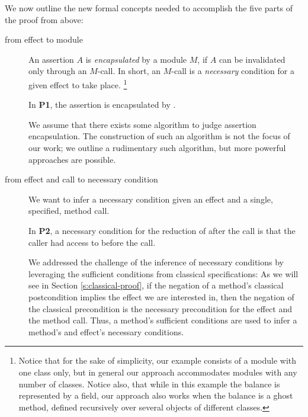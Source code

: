 We  now outline  the new formal concepts needed to accomplish the five parts of the proof from above:

\begin{description}
  \item[from effect to module]  An assertion $A$  is
\emph{encapsulated} by a module $M$, if  $A$ can be invalidated only through
    an $M$-\internalC call. 
  In short, an $M$-\internalC call is a \emph{necessary} condition for
a given effect to take place.
\footnote{Notice that for the sake of simplicity, our example consists of a module with one class only, but 
    in general our approach accommodates modules with any number of classes.
     Notice also, that while in this example  the balance is 
represented by a field, our approach also works when the balance is a ghost method, defined 
recursively over several objects of different classes.}

In \textbf{P1}, the assertion  is encapsulated by .

We assume that there exists some algorithm to judge assertion encapsulation.
The construction of such an algorithm is not the focus of our work;
  we  outline a rudimentary such algorithm, but more powerful
approaches are possible. 
 

\item[from effect and call to necessary condition] We want to infer
a necessary condition given an effect and
a single, specified, method call. 

In \textbf{P2},   a necessary condition for the  reduction of   after the call  is that the caller had access to  before the call.

We addressed the challenge of the inference of necessary conditions 
 by leveraging the sufficient conditions from classical specifications:
 As we will see in Section \ref{s:classical-proof}, 
if the negation of a method's
 classical postcondition implies  the effect we are interested in, then the negation of the 
 classical precondition  is the necessary precondition for the effect and the method call. Thus, 
  a method's sufficient conditions are used to infer a method's and effect's necessary conditions.



\end{description}

